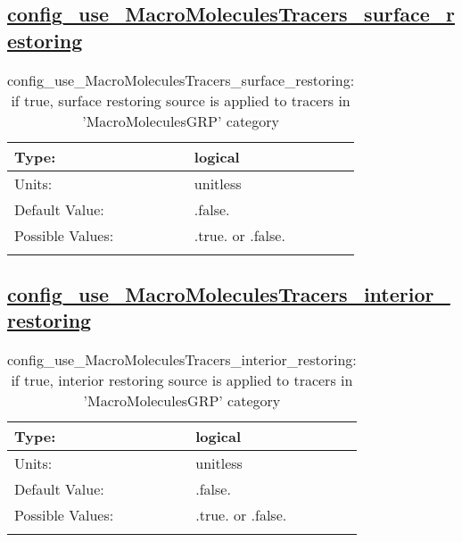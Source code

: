 \subsection[config\_use\_MacroMoleculesTracers\_surface\_restoring]{\hyperref[sec:nm_tab_tracer_forcing_MacroMoleculesTracers]{config\_use\_MacroMoleculesTracers\_surface\_restoring}}
\label{subsec:nm_sec_config_use_MacroMoleculesTracers_surface_restoring}
\begin{center}
\begin{longtable}{| p{2.0in} || p{4.0in} |}
    \hline
    Type: & logical \\
    \hline
    Units: & \si{unitless} \\
    \hline
    Default Value: & .false. \\
    \hline
    Possible Values: & .true. or .false. \\
    \hline
    \caption{config\_use\_MacroMoleculesTracers\_surface\_restoring: if true, surface restoring source is applied to tracers in 'MacroMoleculesGRP' category}
\end{longtable}
\end{center}
\subsection[config\_use\_MacroMoleculesTracers\_interior\_restoring]{\hyperref[sec:nm_tab_tracer_forcing_MacroMoleculesTracers]{config\_use\_MacroMoleculesTracers\_interior\_restoring}}
\label{subsec:nm_sec_config_use_MacroMoleculesTracers_interior_restoring}
\begin{center}
\begin{longtable}{| p{2.0in} || p{4.0in} |}
    \hline
    Type: & logical \\
    \hline
    Units: & \si{unitless} \\
    \hline
    Default Value: & .false. \\
    \hline
    Possible Values: & .true. or .false. \\
    \hline
    \caption{config\_use\_MacroMoleculesTracers\_interior\_restoring: if true, interior restoring source is applied to tracers in 'MacroMoleculesGRP' category}
\end{longtable}
\end{center}
